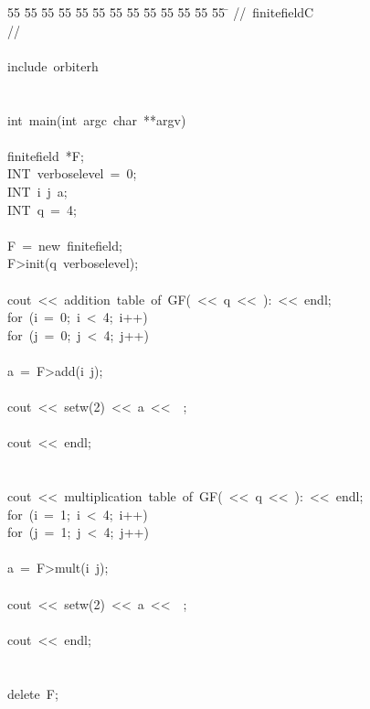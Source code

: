%
%
\begin{tabbing}
55 \= 55 \= 55 \= 55 \= 55 \= 55 \= 55 \= 55 \= 55 \= 55 \= 55 \= 55 \= 55 \= \kill
//\ finitefieldC\\[0pt]
//\ \\[0pt]
\\[0pt]
include\ orbiterh\\[0pt]
\\[0pt]
\\[0pt]
int\ main(int\ argc\ char\ **argv)\\[0pt]
\\[0pt]
\>finitefield\ *F;\\[0pt]
\>INT\ verboselevel\ =\ 0;\\[0pt]
\>INT\ i\ j\ a;\\[0pt]
\>INT\ q\ =\ 4;\\[0pt]
\\[0pt]
\>F\ =\ new\ finitefield;\\[0pt]
\>F>init(q\ verboselevel);\\[0pt]
\\[0pt]
\>cout\ <<\ addition\ table\ of\ GF(\ <<\ q\ <<\ ):\ <<\ endl;\\[0pt]
\>for\ (i\ =\ 0;\ i\ <\ 4;\ i++)\ \\[0pt]
\>\>for\ (j\ =\ 0;\ j\ <\ 4;\ j++)\ \\[0pt]
\>\>\>\\[0pt]
\>\>\>a\ =\ F>add(i\ j);\\[0pt]
\\[0pt]
\>\>\>cout\ <<\ setw(2)\ <<\ a\ <<\ \ ;\\[0pt]
\>\>\>\\[0pt]
\>\>cout\ <<\ endl;\\[0pt]
\>\>\\[0pt]
\\[0pt]
\>cout\ <<\ multiplication\ table\ of\ GF(\ <<\ q\ <<\ ):\ <<\ endl;\\[0pt]
\>for\ (i\ =\ 1;\ i\ <\ 4;\ i++)\ \\[0pt]
\>\>for\ (j\ =\ 1;\ j\ <\ 4;\ j++)\ \\[0pt]
\>\>\>\\[0pt]
\>\>\>a\ =\ F>mult(i\ j);\\[0pt]
\\[0pt]
\>\>\>cout\ <<\ setw(2)\ <<\ a\ <<\ \ ;\\[0pt]
\>\>\>\\[0pt]
\>\>cout\ <<\ endl;\\[0pt]
\>\>\\[0pt]
\\[0pt]
\>delete\ F;\\[0pt]
\\[0pt]
\\[0pt]
\\[0pt]
\end{tabbing}
